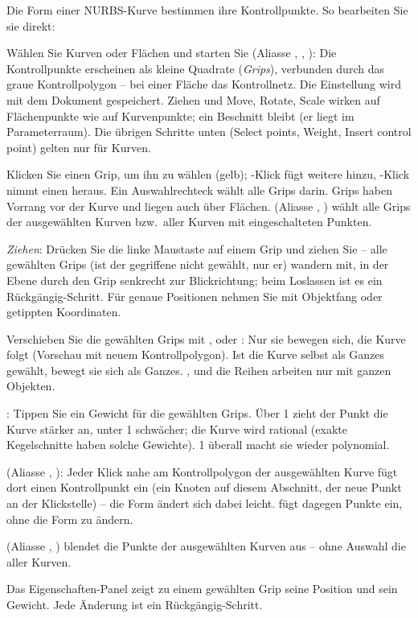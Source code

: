 Die Form einer NURBS-Kurve bestimmen ihre Kontrollpunkte. So bearbeiten Sie sie direkt:
\begin{schritte}
\item Wählen Sie Kurven oder Flächen und starten Sie  (Aliasse ,
  , ): Die Kontrollpunkte erscheinen als kleine Quadrate
  (\emph{Grips}), verbunden durch das graue Kontrollpolygon -- bei einer Fläche das Kontrollnetz.
  Die Einstellung wird mit dem Dokument gespeichert. Ziehen und Move, Rotate, Scale wirken auf
  Flächenpunkte wie auf Kurvenpunkte; ein Beschnitt bleibt (er liegt im Parameterraum). Die
  übrigen Schritte unten (Select points, Weight, Insert control point) gelten nur für Kurven.
\item Klicken Sie einen Grip, um ihn zu wählen (gelb); -Klick fügt weitere hinzu,
  -Klick nimmt einen heraus. Ein Auswahlrechteck wählt alle Grips darin. Grips haben
  Vorrang vor der Kurve und liegen auch über Flächen.  (Aliasse
  , ) wählt alle Grips der ausgewählten Kurven bzw.\ aller
  Kurven mit eingeschalteten Punkten.
\item \emph{Ziehen}: Drücken Sie die linke Maustaste auf einem Grip und ziehen Sie -- alle
  gewählten Grips (ist der gegriffene nicht gewählt, nur er) wandern mit, in der Ebene durch den
  Grip senkrecht zur Blickrichtung; beim Loslassen ist es ein Rückgängig-Schritt. Für genaue
  Positionen nehmen Sie  mit Objektfang oder getippten Koordinaten.
\item Verschieben Sie die gewählten Grips mit ,  oder : Nur sie
  bewegen sich, die Kurve folgt (Vorschau mit neuem Kontrollpolygon). Ist die Kurve selbst als
  Ganzes gewählt, bewegt sie sich als Ganzes. ,  und die Reihen arbeiten nur
  mit ganzen Objekten.
\item {}: Tippen Sie ein Gewicht für die gewählten Grips. Über 1 zieht der Punkt die
  Kurve stärker an, unter 1 schwächer; die Kurve wird rational (exakte Kegelschnitte haben solche
  Gewichte). 1 überall macht sie wieder polynomial.
\item {} (Aliasse , ): Jeder Klick
  nahe am Kontrollpolygon der ausgewählten Kurve fügt dort einen Kontrollpunkt ein (ein Knoten
  auf diesem Abschnitt, der neue Punkt an der Klickstelle) -- die Form ändert sich dabei leicht.
   fügt dagegen Punkte ein, ohne die Form zu ändern.
\item {} (Aliasse , ) blendet die Punkte der
  ausgewählten Kurven aus -- ohne Auswahl die aller Kurven.
\end{schritte}
Das Eigenschaften-Panel zeigt zu einem gewählten Grip seine Position und sein Gewicht. Jede
Änderung ist ein Rückgängig-Schritt.

